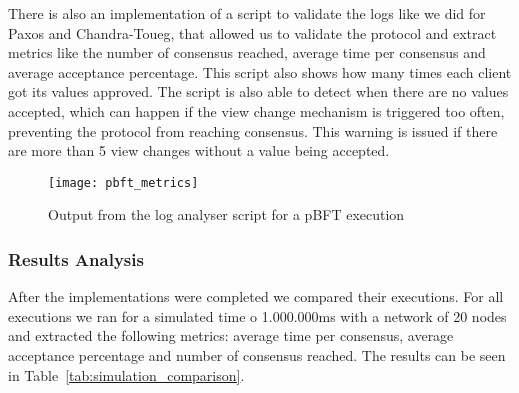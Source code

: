 There is also an implementation of a script to validate the logs like we did for Paxos and Chandra-Toueg,
that allowed us to validate the protocol and extract metrics like the number of consensus reached,
average time per consensus and average acceptance percentage. This script also shows how many times each client
got its values approved.
The script is also able to detect when there are no values accepted, which can happen if the view change
mechanism is triggered too often, preventing the protocol from reaching consensus. This warning is issued if there
are more than 5 view changes without a value being accepted.

\begin{figure}[h]
	\centering
	\texttt{[image: pbft\_metrics]}
	\caption{Output from the log analyser script for a pBFT execution}
	\label{fig:pbft_metrics}
\end{figure}

\subsubsection{Results Analysis}\label{sub:results_comparison}
After the implementations were completed we compared their executions.
For all executions we ran for a simulated time o 1.000.000ms with a network of 20 nodes and extracted
the following metrics: average time per consensus, average acceptance percentage and number of consensus reached.
The results can be seen in Table~\ref{tab:simulation_comparison}.


